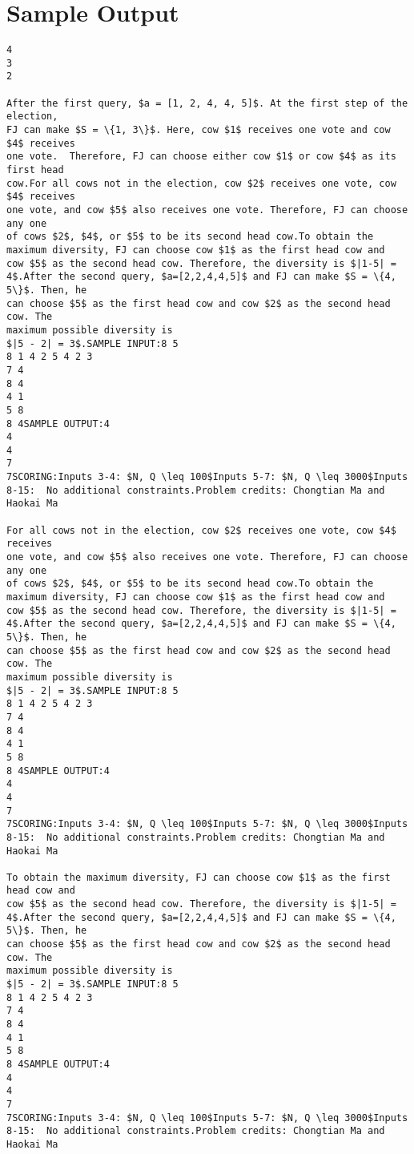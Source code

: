 \documentclass[12pt]{article}
\begin{document}
\section*{Sample Output}
\begin{verbatim}
4
3
2

After the first query, $a = [1, 2, 4, 4, 5]$. At the first step of the election,
FJ can make $S = \{1, 3\}$. Here, cow $1$ receives one vote and cow $4$ receives
one vote.  Therefore, FJ can choose either cow $1$ or cow $4$ as its first head
cow.For all cows not in the election, cow $2$ receives one vote, cow $4$ receives
one vote, and cow $5$ also receives one vote. Therefore, FJ can choose any one
of cows $2$, $4$, or $5$ to be its second head cow.To obtain the maximum diversity, FJ can choose cow $1$ as the first head cow and
cow $5$ as the second head cow. Therefore, the diversity is $|1-5| = 4$.After the second query, $a=[2,2,4,4,5]$ and FJ can make $S = \{4, 5\}$. Then, he
can choose $5$ as the first head cow and cow $2$ as the second head cow. The
maximum possible diversity is
$|5 - 2| = 3$.SAMPLE INPUT:8 5
8 1 4 2 5 4 2 3
7 4
8 4
4 1
5 8
8 4SAMPLE OUTPUT:4
4
4
7
7SCORING:Inputs 3-4: $N, Q \leq 100$Inputs 5-7: $N, Q \leq 3000$Inputs 8-15:  No additional constraints.Problem credits: Chongtian Ma and Haokai Ma

For all cows not in the election, cow $2$ receives one vote, cow $4$ receives
one vote, and cow $5$ also receives one vote. Therefore, FJ can choose any one
of cows $2$, $4$, or $5$ to be its second head cow.To obtain the maximum diversity, FJ can choose cow $1$ as the first head cow and
cow $5$ as the second head cow. Therefore, the diversity is $|1-5| = 4$.After the second query, $a=[2,2,4,4,5]$ and FJ can make $S = \{4, 5\}$. Then, he
can choose $5$ as the first head cow and cow $2$ as the second head cow. The
maximum possible diversity is
$|5 - 2| = 3$.SAMPLE INPUT:8 5
8 1 4 2 5 4 2 3
7 4
8 4
4 1
5 8
8 4SAMPLE OUTPUT:4
4
4
7
7SCORING:Inputs 3-4: $N, Q \leq 100$Inputs 5-7: $N, Q \leq 3000$Inputs 8-15:  No additional constraints.Problem credits: Chongtian Ma and Haokai Ma

To obtain the maximum diversity, FJ can choose cow $1$ as the first head cow and
cow $5$ as the second head cow. Therefore, the diversity is $|1-5| = 4$.After the second query, $a=[2,2,4,4,5]$ and FJ can make $S = \{4, 5\}$. Then, he
can choose $5$ as the first head cow and cow $2$ as the second head cow. The
maximum possible diversity is
$|5 - 2| = 3$.SAMPLE INPUT:8 5
8 1 4 2 5 4 2 3
7 4
8 4
4 1
5 8
8 4SAMPLE OUTPUT:4
4
4
7
7SCORING:Inputs 3-4: $N, Q \leq 100$Inputs 5-7: $N, Q \leq 3000$Inputs 8-15:  No additional constraints.Problem credits: Chongtian Ma and Haokai Ma


\end{verbatim}
\end{document}
